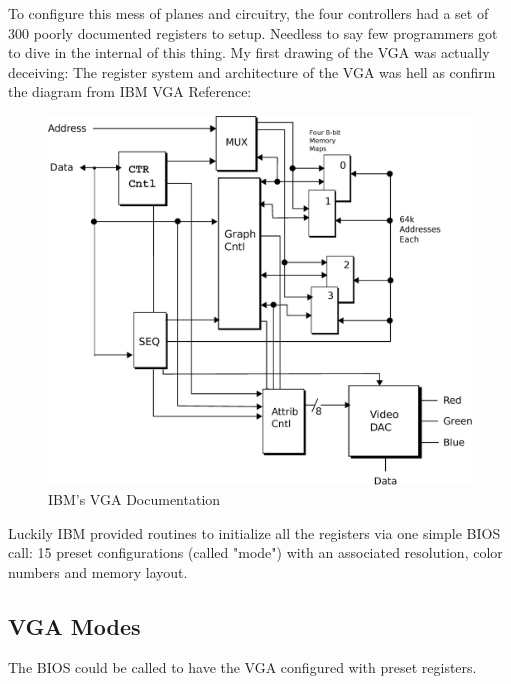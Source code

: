 \documentclass[book.tex]{subfiles}
\begin{document}
 

 

\par
To configure this mess of planes and circuitry, the four controllers had a set of 300 poorly documented registers to setup. Needless to say few programmers got to dive in the internal of this thing. My first drawing of the VGA was actually deceiving: The register system and architecture of the VGA was hell as confirm the diagram from IBM VGA Reference:\\
 \begin{figure}[H]
\centering
\includegraphics[width=\textwidth]{imgs/ibm_vga.eps}
%
\caption{IBM's VGA Documentation}
\label{fig:ibm_vga}
\end{figure}

\bigskip



Luckily IBM provided routines to initialize all the registers via one simple BIOS call: 15 preset configurations (called "mode") with an associated resolution, color numbers and memory layout.

\subsection{VGA Modes}

The BIOS could be called to have the VGA configured with preset registers.
\end{document}
